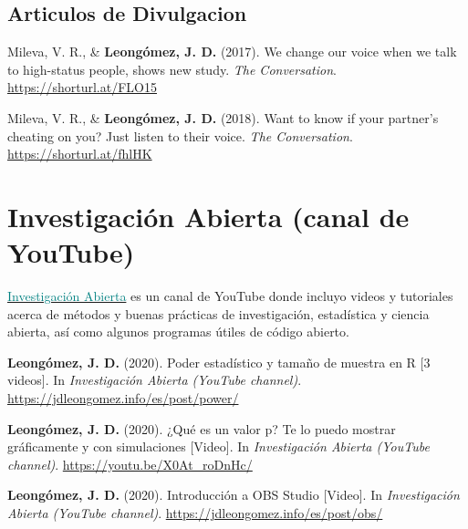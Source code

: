\documentclass[11pt, a4paper]{awesome-cv}
\begin{document}
\endgroup

\hypertarget{articulos-de-divulgacion}{%
\subsection{Articulos de Divulgacion}\label{articulos-de-divulgacion}}

\begingroup
\setlength{\parindent}{-0.5in}
\setlength{\leftskip}{0.5in}

\hypertarget{refs_divulgation}{}
\leavevmode\hypertarget{ref-Mileva2017}{}%
Mileva, V. R., \& \textbf{Leongómez, J. D.} (2017). {We change our voice
when we talk to high-status people, shows new study}. \emph{The
Conversation}. \url{https://shorturl.at/FLO15}

\leavevmode\hypertarget{ref-Mileva2018}{}%
Mileva, V. R., \& \textbf{Leongómez, J. D.} (2018). {Want to know if
your partner's cheating on you? Just listen to their voice}. \emph{The
Conversation}. \url{https://shorturl.at/fhlHK}

\endgroup

\hypertarget{investigaciuxf3n-abierta-canal-de-youtube}{%
\section{Investigación Abierta (canal de
YouTube)}\label{investigaciuxf3n-abierta-canal-de-youtube}}

\href{https://www.youtube.com/user/juanleongomez/featured}{\textcolor{teal}{Investigación Abierta}}
es un canal de YouTube donde incluyo videos y tutoriales acerca de
métodos y buenas prácticas de investigación, estadística y ciencia
abierta, así como algunos programas útiles de código abierto.

\begingroup
\setlength{\parindent}{-0.5in}
\setlength{\leftskip}{0.5in}

\hypertarget{refs_IA}{}
\leavevmode\hypertarget{ref-leongomezPower2020}{}%
\textbf{Leongómez, J. D.} (2020). {Poder estadístico y tamaño de muestra
en R {[}3 videos{]}}. In \emph{{Investigación Abierta (YouTube
channel)}}. \url{https://jdleongomez.info/es/post/power/}

\leavevmode\hypertarget{ref-leongomezValorP2020}{}%
\textbf{Leongómez, J. D.} (2020). {¿Qué es un valor p? Te lo puedo
mostrar gráficamente y con simulaciones {[}Video{]}}. In
\emph{{Investigación Abierta (YouTube channel)}}.
\url{https://youtu.be/X0At_roDnHc/}

\leavevmode\hypertarget{ref-leongomezIntroduccionOBSStudio2020}{}%
\textbf{Leongómez, J. D.} (2020). {Introducción a OBS Studio
{[}Video{]}}. In \emph{{Investigación Abierta (YouTube channel)}}.
\url{https://jdleongomez.info/es/post/obs/}
\end{document}
